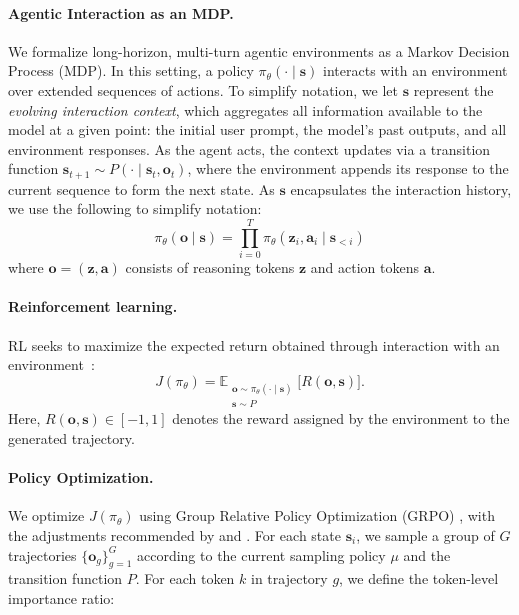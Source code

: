 \documentclass[]{servicenow} %
\begin{document}
\paragraph{Agentic Interaction as an MDP.}
We formalize long-horizon, multi-turn agentic environments as a Markov Decision Process (MDP). In this setting, a policy $\pi_\theta(\cdot \mid \mathbf{s})$ interacts with an environment over extended sequences of actions. 
To simplify notation, we let $\mathbf{s}$ represent the \emph{evolving interaction context}, which aggregates all information available to the model at a given point: the initial user prompt, the model’s past outputs, and all environment responses. 
As the agent acts, the context updates via a transition function $\mathbf{s}_{t+1} \sim P(\cdot \mid \mathbf{s}_t, \mathbf{o}_t)$, where the environment appends its response to the current sequence to form the next state. 
As $\mathbf{s}$ encapsulates the interaction history, we use the following to simplify notation:
\begin{equation*}
\pi_\theta(\mathbf{o} \mid \mathbf{s}) = \prod_{i=0}^{T} \pi_\theta(\mathbf{z}_i, \mathbf{a}_i \mid \mathbf{s}_{<i})
\end{equation*}
where $\mathbf{o} = (\mathbf{z}, \mathbf{a})$ consists of reasoning tokens $\mathbf{z}$ and action tokens $\mathbf{a}$.

\paragraph{Reinforcement learning.}
RL seeks to maximize the expected return obtained through interaction with an environment~\citep{sutton1999policy}:
\begin{equation*}
J(\pi_\theta) = \mathbb{E}_{\substack{\mathbf{o} \sim \pi_\theta(\cdot \mid \mathbf{s}) \\ \mathbf{s} \sim P}} \Big[ R(\mathbf{o}, \mathbf{s}) \Big].
\end{equation*}
Here, $R(\mathbf{o}, \mathbf{s}) \in [-1, 1]$ denotes the reward assigned by the environment to the generated trajectory.

\paragraph{Policy Optimization.}
We optimize $J(\pi_\theta)$ using Group Relative Policy Optimization (GRPO) \citep{shao2024deepseekmathpushinglimitsmathematical,deepseekr1}, with the adjustments recommended by \citet{yu2025dapo} and \citet{liu2025understandingr1zeroliketrainingcritical}. For each state $\mathbf{s}_i$, we sample a group of $G$ trajectories $\{\mathbf{o}_{g}\}_{g=1}^G$ according to the current sampling policy $\mu$ and the transition function $P$. For each token $k$ in trajectory $g$, we define the token-level importance ratio:
\end{document}
